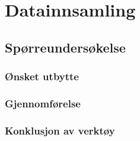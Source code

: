\chapter{Datainnsamling}

\section{Spørreundersøkelse}

\subsection{Ønsket utbytte}

\subsection{Gjennomførelse}

\subsection{Konklusjon av verktøy}
